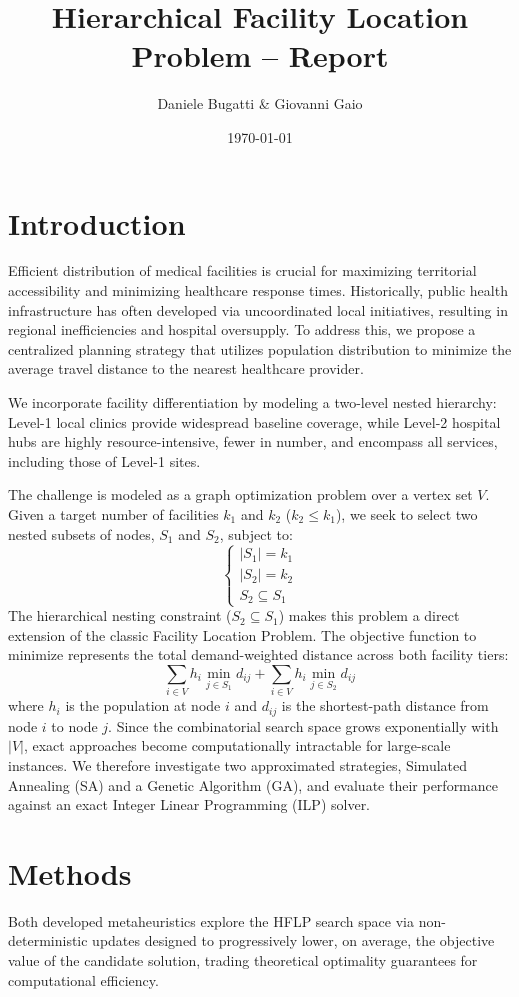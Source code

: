 \documentclass[a4paper,11pt, twocolumn]{article}
\title{Hierarchical Facility Location Problem -- Report}
\author{Daniele Bugatti \& Giovanni Gaio}
\date{\today}
\begin{document}
\maketitle

\section{Introduction}
Efficient distribution of medical facilities is crucial for maximizing territorial accessibility and minimizing healthcare response times. Historically, public health infrastructure has often developed via uncoordinated local initiatives, resulting in regional inefficiencies and hospital oversupply. To address this, we propose a centralized planning strategy that utilizes population distribution to minimize the average travel distance to the nearest healthcare provider.

We incorporate facility differentiation by modeling a two-level nested hierarchy: Level-1 local clinics provide widespread baseline coverage, while Level-2 hospital hubs are highly resource-intensive, fewer in number, and encompass all services, including those of Level-1 sites. 

The challenge is modeled as a graph optimization problem over a vertex set $V$. Given a target number of facilities $k_1$ and $k_2$ ($k_2 \leq k_1$), we seek to select two nested subsets of nodes, $S_1$ and $S_2$, subject to:
\[
\begin{cases}
|S_1| = k_1 \\
|S_2| = k_2 \\
S_2 \subseteq S_1
\end{cases}
\]
The hierarchical nesting constraint ($S_2 \subseteq S_1$) makes this problem a direct extension of the classic Facility Location Problem. The objective function to minimize represents the total demand-weighted distance across both facility tiers:
\[
\sum_{i \in V} h_i \min_{j \in S_1} d_{ij} + \sum_{i \in V} h_i \min_{j \in S_2} d_{ij}
\]
where $h_i$ is the population at node $i$ and $d_{ij}$ is the shortest-path distance from node $i$ to node $j$. Since the combinatorial search space grows exponentially with $|V|$, exact approaches become computationally intractable for large-scale instances. We therefore investigate two approximated strategies, Simulated Annealing (SA) and a Genetic Algorithm (GA), and evaluate their performance against an exact Integer Linear Programming (ILP) solver.

\section{Methods}
Both developed metaheuristics explore the HFLP search space via non-deterministic updates designed to progressively lower, on average, the objective value of the candidate solution, trading theoretical optimality guarantees for computational efficiency.
\end{document}
